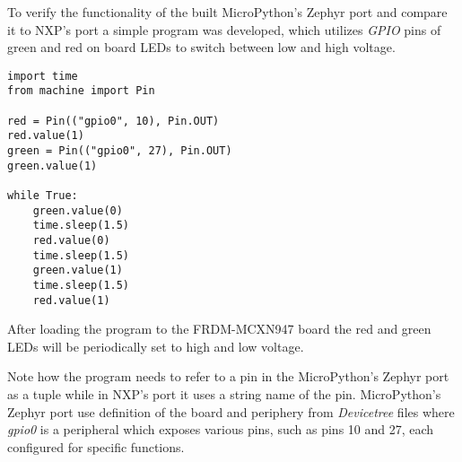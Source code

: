 \documentclass[twoside, 12pt]{article}
\begin{document}
To verify the functionality of the built MicroPython's Zephyr port and compare it to NXP's 
port a simple program was developed, which utilizes \textit{GPIO} pins of green and red on 
board LEDs to switch between low and high voltage.

\begin{lstlisting}[caption=Led program for MicroPython's Zephyr port, breaklines=true]
import time
from machine import Pin

red = Pin(("gpio0", 10), Pin.OUT)
red.value(1)
green = Pin(("gpio0", 27), Pin.OUT)
green.value(1)

while True:
    green.value(0)
    time.sleep(1.5)
    red.value(0)
    time.sleep(1.5)
    green.value(1)
    time.sleep(1.5)
    red.value(1)
\end{lstlisting}

After loading the program to the FRDM-MCXN947 board the red and green LEDs will be periodically set to high and low voltage.

Note how the program needs to refer to a pin in the MicroPython's Zephyr port as a tuple 
while in NXP's port it uses a string name of the pin. MicroPython's Zephyr port use 
definition of the board and periphery from \textit{Devicetree} files where \textit{gpio0} is 
a peripheral which exposes various pins, such as pins 10 and 27, each configured for specific 
functions.
\end{document}
